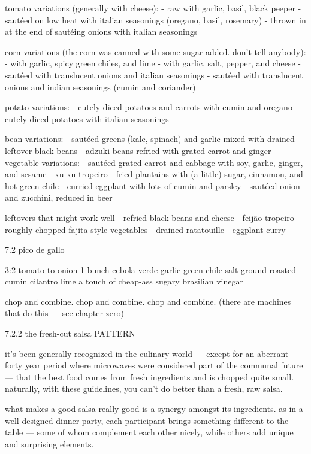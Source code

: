 tomato variations (generally with cheese):
	-	raw with garlic, basil, black peeper
	-	saut\'{e}ed on low heat with italian seasonings (oregano, basil, rosemary)
	-	thrown in at the end of saut\'{e}ing onions with italian seasonings

corn variations (the corn was canned with some sugar added. don't tell anybody):
	-	with garlic, spicy green chiles, and lime
	-	with garlic, salt, pepper, and cheese
	-	saut\'{e}ed with translucent onions and italian seasonings
	-	saut\'{e}ed with translucent onions and indian seasonings (cumin and coriander)

potato variations:
	-	cutely diced potatoes and carrots with cumin and oregano
	-	cutely diced potatoes with italian seasonings

bean variations:
	-	saut\'{e}ed greens (kale, spinach) and garlic mixed with drained leftover black beans
	-	adzuki beans refried with grated carrot and ginger
vegetable variations:
	-	saut\'{e}ed grated carrot and cabbage with soy, 
        garlic, ginger, and sesame
	-	xu-xu tropeiro
	-	fried plantains with (a little) sugar, cinnamon, and hot green chile
	-	curried eggplant with lots of cumin and parsley
	-	saut\'{e}ed onion and zucchini, reduced in beer

leftovers that might work well
	-	refried black beans and cheese
	-	feij\~{a}o tropeiro
	-	roughly chopped fajita style vegetables
	-	drained ratatouille
	-	eggplant curry

7.2  pico de gallo

3:2 tomato to onion
1 bunch cebola verde
garlic
green chile
salt
ground roasted cumin
cilantro
lime
a touch of cheap-ass sugary brasilian vinegar

chop and combine. chop and combine. chop and combine. (there are machines that do this --- see chapter zero)

7.2.2  the fresh-cut salsa PATTERN

it's been generally recognized in the culinary world --- except for an aberrant forty year period where microwaves were considered part of the communal future --- that the best food comes from fresh ingredients and is chopped quite small. naturally, with these guidelines, you can't do better than a fresh, raw salsa.

what makes a good salsa really good is a synergy amongst its ingredients. as in a well-designed dinner party, each participant brings something different to the table --- some of whom complement each other nicely, while others add unique and surprising elements.


